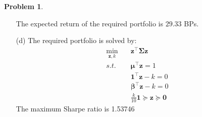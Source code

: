 \documentclass[a4paper, 8pt]{article}
\theoremstyle{definition}
\newtheorem{problem}{Problem}
\theoremstyle{hSol}
\begin{document}
\begin{problem}
\begin{itemize}
	The expected return of the required portfolio is $29.33$ BPs.\\
  \item[(d)] The required portfolio is solved by:
	\begin{equation}
		\begin{split}
			\underset{\bm{z}, k}{\min}\quad&  \bm{z}^{\top} \bm{\Sigma} \bm{z}\\
			s.t. \quad & \bm{\mu}^{\top} \bm{z} = 1\\
			& \bm{1}^{\top} \bm{z} - k =0\\
			& \bm{\beta}^{\top} \bm{z} - k =0\\
			& \frac{k}{10}\bm{1} \succeq \bm{z} \succeq \bm{0}
		\end{split}
	\end{equation}
  The maximum Sharpe ratio is 1.53746
\end{itemize}
\end{problem}
\end{document}
